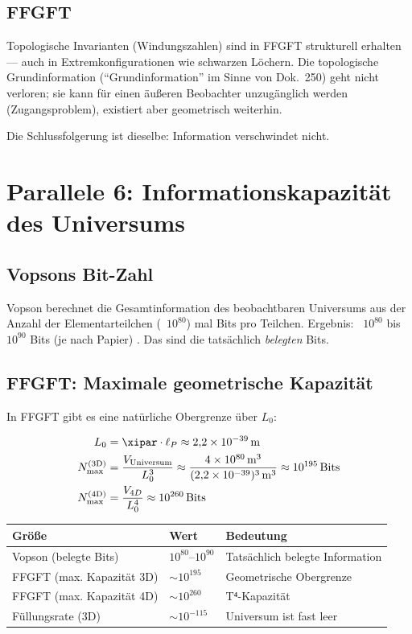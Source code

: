 \subsection{FFGFT}

Topologische Invarianten (Windungszahlen) sind in FFGFT strukturell erhalten
--- auch in Extremkonfigurationen wie schwarzen Löchern. Die topologische
Grundinformation (``Grundinformation'' im Sinne von Dok.~250) geht nicht
verloren; sie kann für einen äußeren Beobachter unzugänglich werden
(Zugangsproblem), existiert aber geometrisch weiterhin.

Die Schlussfolgerung ist dieselbe: Information verschwindet nicht.

\section{Parallele 6: Informationskapazität des Universums}

\subsection{Vopsons Bit-Zahl}

Vopson berechnet die Gesamtinformation des beobachtbaren Universums aus der
Anzahl der Elementarteilchen (~$10^{80}$) mal Bits pro Teilchen.
Ergebnis: ~$10^{80}$ bis $10^{90}$ Bits (je nach Papier) \cite{Vopson2023}.
Das sind die tatsächlich \emph{belegten} Bits.

\subsection{FFGFT: Maximale geometrische Kapazität}

In FFGFT gibt es eine natürliche Obergrenze über $L_0$:

\begin{align}
  L_0 &= \xipar \cdot \ell_P \approx 2{,}2 \times 10^{-39}\,\text{m} \\
  N_\text{max}^\text{(3D)} &= \frac{V_\text{Universum}}{L_0^3}
    \approx \frac{4 \times 10^{80}\,\text{m}^3}{(2{,}2 \times 10^{-39})^3\,\text{m}^3}
    \approx 10^{195}\,\text{Bits} \\
  N_\text{max}^\text{(4D)} &= \frac{V_{4D}}{L_0^4}
    \approx 10^{260}\,\text{Bits}
\end{align}

\begin{longtable}{lll}
\toprule
Größe & Wert & Bedeutung \\
\midrule
Vopson (belegte Bits) & $10^{80}$--$10^{90}$ & Tatsächlich belegte Information \\
FFGFT (max. Kapazität 3D) & $\sim 10^{195}$ & Geometrische Obergrenze \\
FFGFT (max. Kapazität 4D) & $\sim 10^{260}$ & T⁴-Kapazität \\
Füllungsrate (3D) & $\sim 10^{-115}$ & Universum ist fast leer \\
\bottomrule
\end{longtable}

